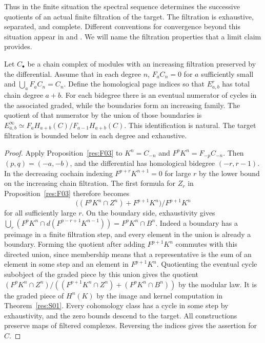 Thus in the finite situation the spectral sequence determines the
successive quotients of an actual finite filtration of the target.
The filtration is exhaustive, separated, and complete. Different
conventions for convergence beyond this situation appear in
\cite[Chapter 3]{mccleary} and \cite[Section 5.2]{weibel}.
We will name the filtration properties that a limit claim provides.

\begin{theorem}
\label{res:S02}
Let $C_\bullet$ be a chain complex of modules with an increasing
filtration preserved by the differential. Assume that in each degree
$n$, $F_aC_n=0$ for $a$ sufficiently small and
$\bigcup_a F_aC_n=C_n$. Define the homological page indices so that
$E^r_{a,b}$ has total chain degree $a+b$. For each bidegree there is
an eventual numerator of cycles in the associated graded, while
the boundaries form an increasing family. The quotient of
that numerator by the union of those boundaries is
$E^\infty_{a,b}\simeq F_aH_{a+b}(C)/F_{a-1}H_{a+b}(C)$.
This identification is natural. The target filtration is bounded
below in each degree and exhaustive.
\end{theorem}

\begin{proof}
Apply Proposition~\ref{res:F03} to $K^n=C_{-n}$ and
$F^pK^n=F_{-p}C_{-n}$. Then $(p,q)=(-a,-b)$, and the
differential has homological bidegree $(-r,r-1)$.
In the decreasing cochain indexing $F^{p+r}K^{n+1}=0$ for large
$r$ by the lower bound on the increasing chain filtration.
The first formula for $Z_r$ in Proposition~\ref{res:F03}
therefore becomes
\[
 \bigl((F^pK^n\cap Z^n)+F^{p+1}K^n\bigr)/F^{p+1}K^n
\]
for all sufficiently large $r$. On the boundary side,
exhaustivity gives
$\bigcup_r (F^pK^n\cap d(F^{p-r+1}K^{n-1}))=F^pK^n\cap B^n$.
Indeed a boundary has a preimage in a finite filtration step,
and every element in the union is already a boundary.
Forming the quotient after adding $F^{p+1}K^n$ commutes with
this directed union, since membership means that a representative
is the sum of an element in some step and an element in
$F^{p+1}K^n$. Quotienting the eventual cycle subobject of the
graded piece by this union gives the quotient
$(F^pK^n\cap Z^n)/((F^{p+1}K^n\cap Z^n)+(F^pK^n\cap B^n))$
by the modular law. It is the graded piece of $H^n(K)$ by the
image and kernel computation in Theorem~\ref{res:S01}.
Every cohomology class has a cycle in some step by exhaustivity,
and the zero bounds descend to the target. All constructions
preserve maps of filtered complexes. Reversing the indices gives
the assertion for $C$.
\end{proof}

